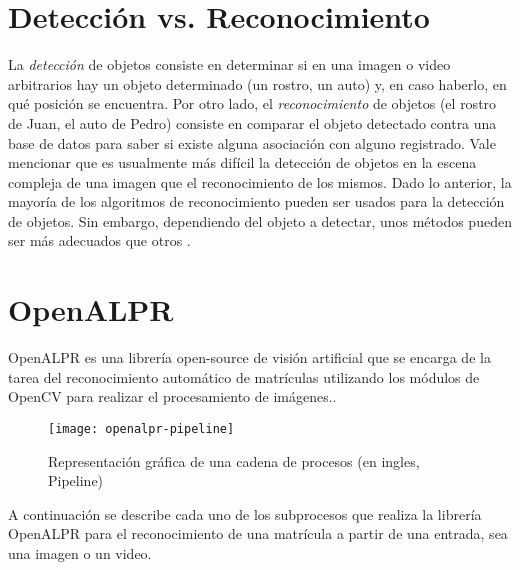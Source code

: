 \section{Detección vs. Reconocimiento}
La\textit{ detección} de objetos consiste en determinar si en una imagen o video arbitrarios hay un objeto determinado (un rostro, un auto) y, en caso haberlo, en qué posición se encuentra. Por otro lado, el \textit{reconocimiento }de objetos (el rostro de Juan, el auto de Pedro) consiste en comparar el objeto detectado contra una base de datos para saber si existe alguna asociación con alguno registrado. Vale mencionar que es usualmente más difícil la detección de objetos en la escena compleja de una imagen que el reconocimiento de los mismos. Dado lo anterior, la mayoría de los algoritmos de reconocimiento pueden ser usados para la detección de objetos. Sin embargo, dependiendo del objeto a detectar, unos métodos pueden ser más adecuados que otros \parencite{Ekvall2005-ut}.
\section{OpenALPR}
OpenALPR es una librería open-source de visión artificial que se encarga de la tarea del reconocimiento automático de matrículas utilizando los módulos de OpenCV para realizar el procesamiento de imágenes..
  
  \begin{figure}[H]
        \centering
        \texttt{[image: openalpr-pipeline]}
        \caption{Representación gráfica de una cadena de procesos (en ingles, Pipeline) \parencite{Saini2015-yp}}
        \label{fig:openalpr-pipeline}
\end{figure}
    
A continuación se describe cada uno de los subprocesos que realiza la librería OpenALPR para el reconocimiento de una matrícula a partir de una entrada, sea una imagen o un video. 

